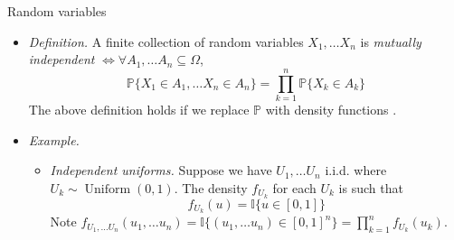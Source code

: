 \documentclass{beamer}
\numberwithin{equation}{section}
\begin{document}
\begin{frame}{Random variables}
    \begin{itemize}
        \item
        \textit{Definition.} A finite collection of random variables
        $ X_1, \ldots X_n $ is \textit{mutually independent}
        $ \Leftrightarrow \forall A_1, \ldots A_n \subseteq \Omega $,
        \begin{equation*}
            \mathbb{P}\{X_1 \in A_1, \ldots X_n \in A_n\} =
            \prod_{k = 1}^n\mathbb{P}\{X_k \in A_k\}
        \end{equation*}
        The above definition holds if we replace $ \mathbb{P} $ with density
        functions \cite{wasserman_stats}.

        \item
        \textit{Example.}
        \begin{itemize}
            \item
            \textit{Independent uniforms.} Suppose we have $ U_1, \ldots U_n $
            i.i.d. where $ U_k \sim \operatorname{Uniform}(0, 1) $. The
            density $ f_{U_k} $ for each $ U_k $ is such that
            \begin{equation*}
                f_{U_k}(u) = \mathbb{I}\{u \in [0, 1]\}
            \end{equation*}
            Note $ f_{U_1, \ldots U_n}(u_1, \ldots u_n) =
            \mathbb{I}\{(u_1, \ldots u_n) \in [0, 1]^n\} =
            \prod_{k = 1}^nf_{U_k}(u_k) $.
        \end{itemize}
    \end{itemize}
\end{frame}
\end{document}
